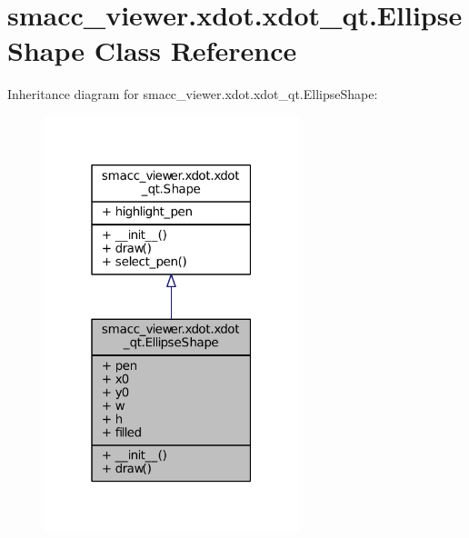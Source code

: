 \hypertarget{classsmacc__viewer_1_1xdot_1_1xdot__qt_1_1EllipseShape}{}\section{smacc\+\_\+viewer.\+xdot.\+xdot\+\_\+qt.\+Ellipse\+Shape Class Reference}
\label{classsmacc__viewer_1_1xdot_1_1xdot__qt_1_1EllipseShape}


Inheritance diagram for smacc\+\_\+viewer.\+xdot.\+xdot\+\_\+qt.\+Ellipse\+Shape\+:
\nopagebreak
\begin{figure}[H]
\begin{center}
\leavevmode
\includegraphics[width=211pt]{classsmacc__viewer_1_1xdot_1_1xdot__qt_1_1EllipseShape__inherit__graph}
\end{center}
\end{figure}


